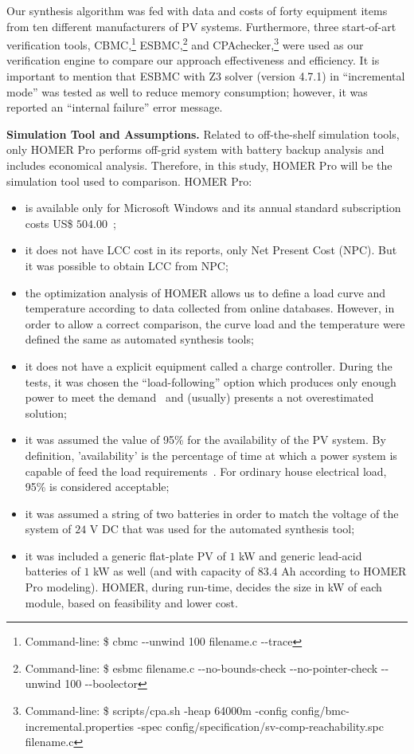 \documentclass[runningheads]{llncs}
\begin{document}
Our synthesis algorithm was fed with data and costs of forty equipment items from ten different manufacturers of PV systems. Furthermore, three start-of-art verification tools, CBMC,\footnote{Command-line: \$ cbmc -\phantom{}-unwind 100 filename.c -\phantom{}-trace} ESBMC,\footnote{Command-line: \$ esbmc filename.c -\phantom{}-no-bounds-check -\phantom{}-no-pointer-check -\phantom{}-unwind 100 -\phantom{}-boolector} and CPAchecker,\footnote{Command-line: \$ scripts/cpa.sh -heap 64000m -config config/bmc-incremental.properties -spec config/specification/sv-comp-reachability.spc filename.c} were used as our verification engine to compare our approach effectiveness and efficiency. It is important to mention that ESBMC with Z3 solver (version 4.7.1) in ``incremental mode'' was tested as well to reduce memory consumption; however, it was reported an ``internal failure'' error message. %

\noindent \textbf{Simulation Tool and Assumptions.} Related to off-the-shelf simulation tools, only HOMER Pro performs off-grid system with battery backup analysis and includes economical analysis. Therefore, in this study, HOMER Pro will be the simulation tool used to comparison. HOMER Pro:

\begin{itemize}
\item is available only for Microsoft Windows and its annual standard subscription costs US\$ $504.00$~\cite{HOMER}; 
\item it does not have LCC cost in its reports, only Net Present Cost (NPC). But it was possible to obtain LCC from NPC; 
\item the optimization analysis of HOMER allows us to define a load curve and temperature according to data collected from online databases. However, in order to allow a correct comparison, the curve load and the temperature were defined the same as automated synthesis tools; 
\item it does not have a explicit equipment called a charge controller. During the tests, it was chosen the ``load-following'' option which produces only enough power to meet the demand~\cite{HOMER} and (usually) presents a not overestimated solution; 
\item it was assumed the value of 95\% for the availability of the PV system. By definition, 'availability' is the percentage of time at which a power system is capable of feed the load requirements~\cite{Khatib2014}. For ordinary house electrical load, 95\% is considered acceptable;
\item it was assumed a string of two batteries in order to match the voltage of the system of $24$ V DC that was used for the automated synthesis tool; 
\item it was included a generic flat-plate PV of $1$ kW and generic lead-acid batteries of $1$ kW as well (and with capacity of $83.4$ Ah according to HOMER Pro modeling). HOMER, during run-time, decides the size in kW of each module, based on feasibility and lower cost.
\end{itemize}
\end{document}
